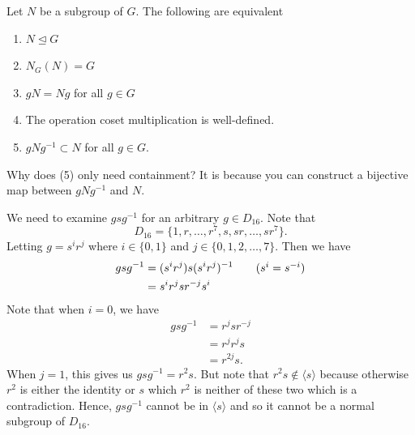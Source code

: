 \begin{theorem}[6]
    Let \( N  \) be a subgroup of \( G  \). The following are equivalent
    \begin{enumerate}
        \item[(1)] \( N \trianglelefteq G  \)
        \item[(2)] \( {N}_{G}(N) = G  \) 
        \item[(3)] \( g N = N g  \) for all \( g \in G  \)
        \item[(4)] The operation coset multiplication is well-defined.
        \item[(5)] \( g N g^{-1} \subset N  \) for all \( g \in G  \).
    \end{enumerate}
\end{theorem}

Why does (5) only need containment? It is because you can construct a bijective map between \( g N g^{-1}  \) and \( N  \).

\begin{eg}
    We need to examine \( g s g^{-1} \) for an arbitrary \( g \in D_{16} \). Note that  
   \[  {D}_{16} = \{  1, r , \dots, r^{7}, s , sr, \dots, s r^{7} \}. \]
   Letting \( g = s^{i} r^{j} \) where \( i \in \{  0 , 1  \}  \) and \( j \in \{  0 , 1,2, \dots, 7 \}  \). Then we have 
   \begin{align*}
       gs g^{-1} &= (s^{i} r^{j}) s (s^{i} r^{j})^{-1} \tag{\( s^{i} = s^{-i} \)} \\
                 &= s^{i} r^{j} s r^{-j} s^{i} 
   \end{align*}
   Note that when \( i = 0  \), we have 
   \begin{align*}
       g s g^{-1} &= r^{j} s r^{-j} \\ 
                  &= r^{j} r^{j} s \\
                  &= r^{2j} s.
   \end{align*}
   When \( j = 1  \), this gives us \( g s g^{-1} = r^{2}s  \). But note that \( r^{2} s  \notin  \langle s \rangle \) because otherwise \( r^{2} \) is either the identity or \( s  \) which \( r^{2} \) is neither of these two which is a contradiction. Hence, \( g s g^{-1} \) cannot be in \( \langle s \rangle  \) and so it cannot be a normal subgroup of \( D_16 \).
\end{eg}

